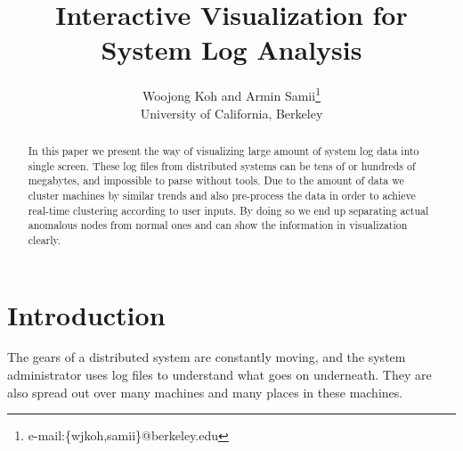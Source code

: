 \documentclass[conference]{style/acmsiggraph}
\title{Interactive Visualization for System Log Analysis}
\author{Woojong Koh and Armin Samii\thanks{e-mail:\{wjkoh,samii\}@berkeley.edu}\\University of California, Berkeley}
\begin{document}

\maketitle

\begin{abstract}

In this paper we present the way of visualizing large amount of system log data into single screen.
These log files from distributed systems can be tens of or hundreds of megabytes, and impossible to
parse without tools. Due to the amount of data we cluster machines by similar trends and also
pre-process the data in order to achieve real-time clustering according to user inputs. By doing so
we end up separating actual anomalous nodes from normal ones and can show the information in
visualization clearly.

\end{abstract}

\begin{CRcatlist}
\end{CRcatlist}

\keywordlist


\TOGlinkslist


\copyrightspace

\section{Introduction}

The gears of a distributed system are constantly moving, and the system administrator uses log files
to understand what goes on underneath. They are also spread out over many machines and many places in
these machines.
\end{document}
